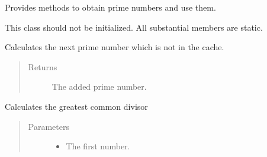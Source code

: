 \documentclass[letterpaper,10pt,english]{sphinxhowto}
\begin{document}
\begin{fulllineitems}
\label{\detokenize{prime:prime.Prime}}
Provides methods to obtain prime numbers and use them.

\begin{fulllineitems}
\label{\detokenize{prime:prime.Prime.__init__}}
This class should not be initialized. All substantial members are static.

\end{fulllineitems}


\begin{fulllineitems}
\label{\detokenize{prime:prime.Prime.append_next_to_cache}}
Calculates the next prime number which is not in the cache.
\begin{quote}\begin{description}
\item[{Returns}] \leavevmode
The added prime number.

\end{description}\end{quote}

\end{fulllineitems}


\begin{fulllineitems}
\label{\detokenize{prime:prime.Prime.cache}}
\end{fulllineitems}


\begin{fulllineitems}
\label{\detokenize{prime:prime.Prime.get_greatest_common_divisor}}
Calculates the greatest common divisor
\begin{quote}\begin{description}
\item[{Parameters}] \leavevmode\begin{itemize}
\item {} 
 \textendash{} The first number.


\end{itemize}
\end{description}
\end{quote}
\end{fulllineitems}
\end{fulllineitems}
\end{document}
